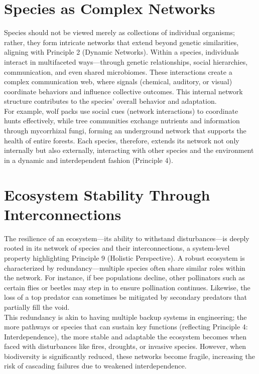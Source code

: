 \documentclass[12pt,openany]{book}
\begin{document}
\section{Species as Complex Networks}
Species should not be viewed merely as collections of individual organisms; rather, they form intricate networks that extend beyond genetic similarities, aligning with Principle 2 (Dynamic Networks). Within a species, individuals interact in multifaceted ways—through genetic relationships, social hierarchies, communication, and even shared microbiomes. These interactions create a complex communication web, where signals (chemical, auditory, or visual) coordinate behaviors and influence collective outcomes. This internal network structure contributes to the species' overall behavior and adaptation.\\[1ex] %
For example, wolf packs use social cues (network interactions) to coordinate hunts effectively, while tree communities exchange nutrients and information through mycorrhizal fungi, forming an underground network that supports the health of entire forests. Each species, therefore, extends its network not only internally but also externally, interacting with other species and the environment in a dynamic and interdependent fashion (Principle 4).

\section{Ecosystem Stability Through Interconnections}
The resilience of an ecosystem—its ability to withstand disturbances—is deeply rooted in its network of species and their interconnections, a system-level property highlighting Principle 9 (Holistic Perspective). A robust ecosystem is characterized by redundancy—multiple species often share similar roles within the network. For instance, if bee populations decline, other pollinators such as certain flies or beetles may step in to ensure pollination continues. Likewise, the loss of a top predator can sometimes be mitigated by secondary predators that partially fill the void.\\[1ex]
This redundancy is akin to having multiple backup systems in engineering; the more pathways or species that can sustain key functions (reflecting Principle 4: Interdependence), the more stable and adaptable the ecosystem becomes when faced with disturbances like fires, droughts, or invasive species. However, when biodiversity is significantly reduced, these networks become fragile, increasing the risk of cascading failures due to weakened interdependence. %
\end{document}
